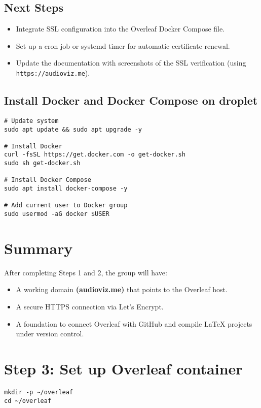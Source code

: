 \subsection{Next Steps}
\begin{itemize}
    \item Integrate SSL configuration into the Overleaf Docker Compose file.
    \item Set up a cron job or systemd timer for automatic certificate renewal.
    \item Update the documentation with screenshots of the SSL verification (using \texttt{https://audioviz.me}).
\end{itemize}

\subsection{Install Docker and Docker Compose on droplet}

\begin{verbatim}
# Update system
sudo apt update && sudo apt upgrade -y

# Install Docker
curl -fsSL https://get.docker.com -o get-docker.sh
sudo sh get-docker.sh

# Install Docker Compose
sudo apt install docker-compose -y

# Add current user to Docker group
sudo usermod -aG docker $USER

\end{verbatim}

\section{Summary}
After completing Steps 1 and 2, the group will have:
\begin{itemize}
    \item A working domain \textbf{(audioviz.me)} that points to the Overleaf host.
    \item A secure HTTPS connection via Let’s Encrypt.
    \item A foundation to connect Overleaf with GitHub and compile LaTeX projects under version control.
\end{itemize}



\section{Step 3: Set up Overleaf container}
\begin{verbatim}
mkdir -p ~/overleaf
cd ~/overleaf
\end{verbatim}

